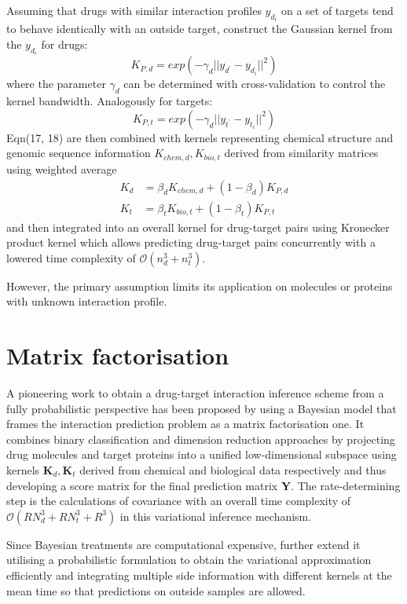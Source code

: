 \documentclass[a4paper,12pt]{report}
\begin{document}
Assuming that drugs with similar interaction profiles $y_{d_i}$ on a set of targets tend to behave identically with an outside target, \citet{van11} construct the Gaussian kernel from the $y_{d_i}$ for drugs:
\begin{equation}
K_{P, d} = exp(-\gamma_d||y_{d^{'}}-y_{d_i}||^2) 
\end{equation}
where the parameter $\gamma_d$ can be determined with cross-validation to control the kernel bandwidth. Analogously for targets:
\begin{equation}
K_{P, t} = exp(-\gamma_d||y_{t^{'}}-y_{t_i}||^2) 
\end{equation}
Eqn(17, 18) are then combined with kernels representing chemical structure and genomic sequence information $K_{chem, d}, K_{bio,t}$ derived from similarity matrices using weighted average
\begin{eqnarray}
K_d &= \beta_dK_{chem, d} + (1 - \beta_d) K_{P, d}\\
K_t &= \beta_tK_{bio, t} + (1-\beta_t)K_{P,t}
\end{eqnarray}
and then integrated into an overall kernel for drug-target pairs using Kronecker product kernel \citep{bas04, ben05, hue10, oya04} which allows predicting drug-target pairs concurrently with a lowered time complexity of $\mathcal{O}(n_d^3 + n_t^3)$. 

However, the primary assumption limits its application on molecules or proteins with unknown interaction profile. 


\section{Matrix factorisation}

A pioneering work to obtain a drug-target interaction inference scheme from a fully probabilistic perspective has been proposed by \citet{gon12} using a Bayesian model that frames the interaction prediction problem as a matrix factorisation one. It combines binary classification and dimension reduction approaches by projecting drug molecules and target proteins into a unified low-dimensional subspace using kernels $\mathbf{K}_d, \mathbf{K}_t$ derived from chemical and biological data respectively and thus developing a score matrix for the final prediction matrix \textbf{Y}. The rate-determining step is the calculations of covariance with an overall time complexity of $\mathcal{O}(RN^3_d + RN^3_t + R^3)$ in this variational inference mechanism.

Since Bayesian treatments are computational expensive, \citet{meh14} further extend it utilising a probabilistic formulation to obtain the variational approximation efficiently and integrating multiple side information with different kernels at the mean time so that predictions on outside samples are allowed.
\end{document}
